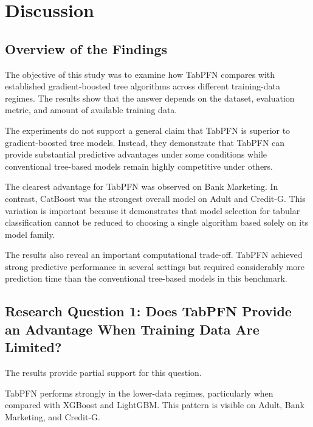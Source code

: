 \section{Discussion}



\subsection{Overview of the Findings}



The objective of this study was to examine how TabPFN compares with established gradient-boosted tree algorithms across different training-data regimes. The results show that the answer depends on the dataset, evaluation metric, and amount of available training data.



The experiments do not support a general claim that TabPFN is superior to gradient-boosted tree models. Instead, they demonstrate that TabPFN can provide substantial predictive advantages under some conditions while conventional tree-based models remain highly competitive under others.



The clearest advantage for TabPFN was observed on Bank Marketing. In contrast, CatBoost was the strongest overall model on Adult and Credit-G. This variation is important because it demonstrates that model selection for tabular classification cannot be reduced to choosing a single algorithm based solely on its model family.



The results also reveal an important computational trade-off. TabPFN achieved strong predictive performance in several settings but required considerably more prediction time than the conventional tree-based models in this benchmark.



\subsection{Research Question 1: Does TabPFN Provide an Advantage When Training Data Are Limited?}



The results provide partial support for this question.



TabPFN performs strongly in the lower-data regimes, particularly when compared with XGBoost and LightGBM. This pattern is visible on Adult, Bank Marketing, and Credit-G.



